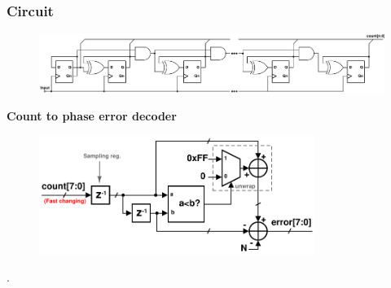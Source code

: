 		\subsubsection{Circuit}
			\begin{figure}[htb!]
			        \centering
			        \includegraphics[width=1\textwidth, angle=0]{./figs/sync_counter.pdf}
			\end{figure}


			\textbf{Count to phase error decoder}
			\begin{figure}[htb!]
			        \centering
			        \includegraphics[width=0.8\textwidth, angle=0]{./figs/sc_decoder}
			\end{figure}



\FloatBarrier
{\color{white}.}
